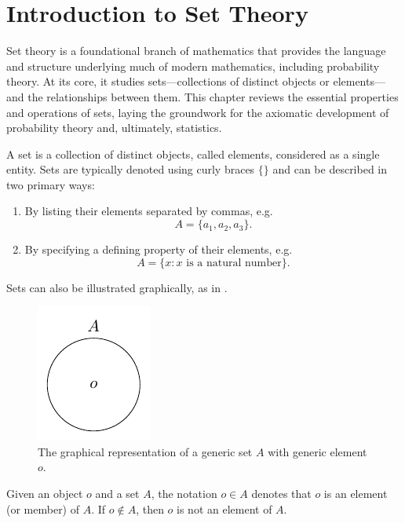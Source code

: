 \chapter{Introduction to Set Theory}
\label{chp:set_theory}
Set theory is a foundational branch of mathematics that provides the language and structure underlying much of modern mathematics, including probability theory. At its core, it studies sets---collections of distinct objects or elements---and the relationships between them. This chapter reviews the essential properties and operations of sets, laying the groundwork for the axiomatic development of probability theory and, ultimately, statistics.

\begin{definition}[Set]
	\label{def:set}
	A set is a collection of distinct objects, called elements, considered as a single entity. Sets are typically denoted using curly braces $\{\}$ and can be described in two primary ways:
	\begin{enumerate}
		\item By listing their elements separated by commas, e.g.
		\begin{equation}
			A = \{a_1, a_2, a_3\}.
		\end{equation}
		\item By specifying a defining property of their elements, e.g.
		\begin{equation}
			A = \{x  \colon x \text{ is a natural number}\}.
		\end{equation}
	\end{enumerate}
	Sets can also be illustrated graphically, as in .
	\begin{figure}[H]
		\centering
		\includegraphics[]{figures/generic_set.pdf}
		\caption{The graphical representation of a generic set $A$ with generic element $o$.}
		\label{fig:generic_set}
	\end{figure}
\end{definition}

\begin{definition}[Membership]
	\label{def:membership}
	Given an object $o$ and a set $A$, the notation $o \in A$ denotes that $o$ is an element (or member) of $A$. If $o \notin A$, then $o$ is not an element of $A$.
\end{definition}

